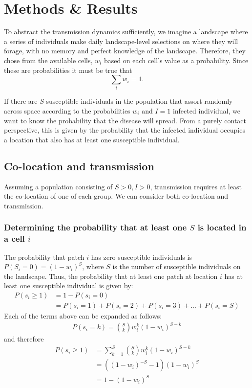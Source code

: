 \section*{Methods \& Results}\label{s:methods-results}

To abstract the transmission dynamics sufficiently, we imagine a landscape where a series of individuals make daily landscape-level selections on where they will forage, with no memory and perfect knowledge of the landscape. Therefore, they chose from the available cells, $w_i$ based on each cell's value as a probability. Since these are probabilities it must be true that 
\begin{equation}
\sum_i w_{i}=1.
\end{equation}

If there are $S$ susceptible individuals in the population that assort randomly across space according to the probabilities $w_{i}$ and $I=1$ infected individual, we want to know the probability that the disease will spread. From a purely contact perspective, this is given by the probability that the infected individual occupies a location that also has at least one susceptible individual.

\subsection{Co-location and transmission}

Assuming a population consisting of $S>0, I>0$, transmission requires at least the co-location of one of each group. We can consider both co-location and transmission.

\subsubsection{Determining the probability that at least one $S$ is located in a cell $i$}

The probability that patch $i$ has zero susceptible individuals is $P(S_{i}=0)=(1-w_{i})^S$, where $S$ is the number of susceptible individuals on the landscape. Thus, the probability that at least one patch at location $i$ has at least one susceptible individual is given by:  
\begin{align}
P(s_{i} \geq 1) &=1-P(s_{i}=0) \\
&=P(s_{i}=1)+P(s_{i}=2)+P(s_{i}=3)+ ... +P(s_{i}=S)
\end{align}
Each of the terms above can be expanded as follows: 
\begin{align}
P(s_{i}=k)=\binom{S}{k}w_{i}^k(1-w_{i})^{S-k}
\end{align}
and therefore
\begin{align}
P(s_{i} \geq 1)&=\sum_{k=1}^{S}\binom{S}{k}w_{i}^k(1-w_{i})^{S-k}\\
&=\left((1-w_{i})^{-S}-1\right)(1-w_{i})^S\\
&=1-(1-w_{i})^S
\end{align}

